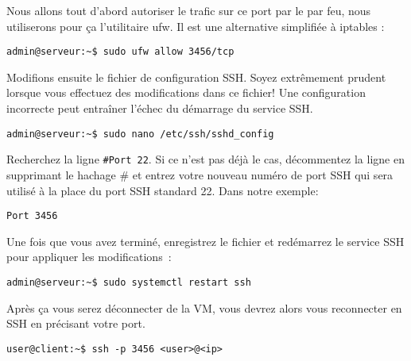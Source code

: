 Nous allons tout d'abord autoriser le trafic sur ce port par le par feu, nous utiliserons pour ça l'utilitaire ufw. Il est une alternative simplifiée à iptables :
\begin{verbatim}
admin@serveur:~$ sudo ufw allow 3456/tcp
\end{verbatim}
Modifions ensuite le fichier de configuration SSH. Soyez extrêmement prudent lorsque vous effectuez des modifications dans ce fichier! Une configuration incorrecte peut entraîner l'échec du démarrage du service SSH.
\begin{verbatim}
admin@serveur:~$ sudo nano /etc/ssh/sshd_config
\end{verbatim}
Recherchez la ligne \texttt{\#Port 22}. Si ce n'est pas déjà le cas, décommentez la ligne en supprimant le hachage \# et entrez votre nouveau numéro de port SSH qui sera utilisé à la place du port SSH standard 22. Dans notre exemple:
\begin{verbatim}
Port 3456
\end{verbatim}
Une fois que vous avez terminé, enregistrez le fichier et redémarrez le service SSH pour appliquer les modifications : 
\begin{verbatim}
admin@serveur:~$ sudo systemctl restart ssh
\end{verbatim}

Après ça vous serez déconnecter de la VM, vous devrez alors vous reconnecter en SSH en précisant votre port.

\begin{verbatim}
user@client:~$ ssh -p 3456 <user>@<ip>
\end{verbatim}



